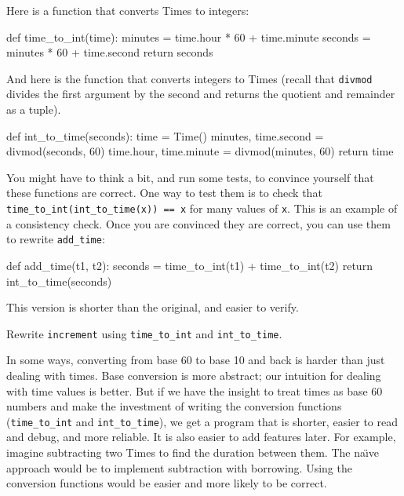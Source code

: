 Here is a function that converts Times to integers:

\beforeverb
\begin{pycode}
def time_to_int(time):
    minutes = time.hour * 60 + time.minute
    seconds = minutes * 60 + time.second
    return seconds
\end{pycode}
\afterverb
%
And here is the function that converts integers to Times
(recall that {\tt divmod} divides the first argument by the second
and returns the quotient and remainder as a tuple).


\beforeverb
\begin{pycode}
def int_to_time(seconds):
    time = Time()
    minutes, time.second = divmod(seconds, 60)
    time.hour, time.minute = divmod(minutes, 60)
    return time
\end{pycode}
\afterverb
%
You might have to think a bit, and run some tests, to convince
yourself that these functions are correct.  One way to test them is to
check that \verb"time_to_int(int_to_time(x)) == x" for many values of
{\tt x}.  This is an example of a consistency check.
%
%
Once you are convinced they are correct, you can use them to 
rewrite \verb"add_time":

\beforeverb
\begin{pycode}
def add_time(t1, t2):
    seconds = time_to_int(t1) + time_to_int(t2)
    return int_to_time(seconds)
\end{pycode}
\afterverb
%
This version is shorter than the original, and easier to verify.

\begin{exercise}
Rewrite {\tt increment} using \verb"time_to_int" and \verb"int_to_time".
\end{exercise}

In some ways, converting from base 60 to base 10 and back is harder
than just dealing with times.  Base conversion is more abstract; our
intuition for dealing with time values is better.
%
But if we have the insight to treat times as base 60 numbers and make
the investment of writing the conversion functions (\verb"time_to_int"
and \verb"int_to_time"), we get a program that is shorter, easier to
read and debug, and more reliable.
%
It is also easier to add features later.  For example, imagine
subtracting two Times to find the duration between them.  The
na\"{\i}ve approach would be to implement subtraction with borrowing.
Using the conversion functions would be easier and more likely to be
correct.

